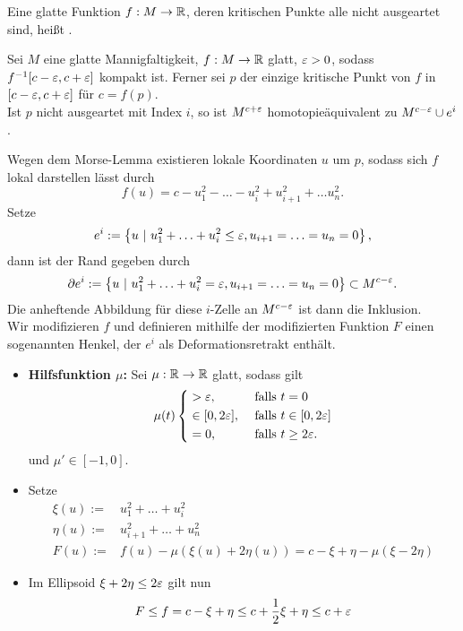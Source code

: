 \Def{}
Eine glatte Funktion $f : M \overset{}{\rightarrow} \mathbb{R}$, deren kritischen Punkte alle nicht ausgeartet sind, heißt .

\Satz{}
Sei $M$ eine glatte Mannigfaltigkeit, $f : M \overset{{}}{\rightarrow} \mathbb{R}$ glatt, $\varepsilon > 0$, sodass $f^{-1}[c-\varepsilon, c +\varepsilon]$ kompakt ist. Ferner sei $p$ der einzige kritische Punkt von $f$ in $[c - \varepsilon, c + \varepsilon]$ für $c = f(p)$.\\
Ist $p$ nicht ausgeartet mit Index $i$, so ist $M^{c+\varepsilon}$ homotopieäquivalent zu $M^{c-\varepsilon} \cup e^i$.

\begin{Beweis}{}
Wegen dem Morse-Lemma existieren lokale Koordinaten $u$ um $p$, sodass sich $f$ lokal darstellen lässt durch
\[ f(u) = c - u_1^2 - \ldots - u_i^2 + u_{i+1}^2 + \ldots u_n^2. \]
Setze
\[ e^i := \set{u}{ u_1^2 + \ldots + u_i^2 \leq \e, u_{i+1} = \ldots = u_n = 0 }, \]
dann ist der Rand gegeben durch
\[ \partial e^i := \set{u}{ u_1^2 + \ldots + u_i^2 = \e, u_{i+1} = \ldots = u_n = 0 }\subset M^{c- \e}. \]
Die anheftende Abbildung für diese $i$-Zelle an $ M^{c- \varepsilon}$ ist dann die Inklusion.\\
Wir modifizieren $f$ und definieren mithilfe der modifizierten Funktion $F$ einen sogenannten Henkel, der $e^i$ als Deformationsretrakt enthält.
\begin{itemize}
	\item \textbf{Hilfsfunktion $\mu$:} Sei $\mu : \mathbb{R} \overset{{}}{\rightarrow} \mathbb{R}$ glatt, sodass gilt
	\begin{align*}
	\mu(t) \left\lbrace
	\begin{aligned}
	&> \varepsilon,&& \text{ falls } t = 0\\
	& \in [0, 2\varepsilon],&& \text{ falls } t  \in [0, 2\varepsilon]\\
	&= 0,&& \text{ falls } t \geq 2 \varepsilon.
	\end{aligned}
	\right.
	\end{align*}
	und $\mu' \in [-1,0]$.
	\item Setze
	\begin{align*}
	\xi(u) :=&u_1^2 + \ldots + u_i^2\\
	\eta(u) :=&u_{i+1}^2 + \ldots + u_n^2\\
	F(u) := & f(u) - \mu( \xi(u) + 2 \eta(u) ) = c - \xi + \eta - \mu(\xi  - 2 \eta)
	\end{align*}
	\item Im Ellipsoid $\xi + 2 \eta \leq 2\varepsilon$ gilt nun
	\begin{align*}
	F \leq f = c - \xi + \eta \leq c + \frac{1}{2} \xi + \eta \leq c + \e 

\end{align*}
\end{itemize}
\end{Beweis}
